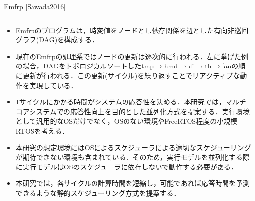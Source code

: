 \documentclass[dvipdfmx,final,t,10pt]{beamer}
\begin{document}
\begin{frame}[fragile]
    \begin{block}{Emfrp \small{[Sawada2016]}}
        \begin{columns}
            \begin{column}{0.55\textwidth}
                \vskip -0.4cm
                \begin{itemize}
                    \item Emfrpのプログラムは，時変値をノードとし依存関係を辺とした有向非巡回グラフ(DAG)を構成する．
                    \item 現在のEmfrpの処理系ではノードの更新は逐次的に行われる．左に挙げた例の場合，DAGをトポロジカルソートしたtmp$\rightarrow$hmd$\rightarrow$di$\rightarrow$th$\rightarrow$fanの順に更新が行われる．この更新(サイクル)を繰り返すことでリアクティブな動作を実現している．
                    \item 1サイクルにかかる時間がシステムの応答性を決める．本研究では，マルチコアシステムでの応答性向上を目的とした並列化方式を提案する．実行環境として汎用的なOSだけでなく，OSのない環境やFreeRTOS程度の小規模RTOSを考える．
                    \item 本研究の想定環境にはOSによるスケジューラによる適切なスケジューリングが期待できない環境も含まれている．そのため，実行モデルを並列化する際に実行モデルはOSのスケジューラに依存しないで動作する必要がある．
                    \item 本研究では，各サイクルの計算時間を短縮し，可能であれば応答時間を予測できるような静的スケジューリング方式を提案する．
                \end{itemize}
            \end{column}
        \end{columns}
    \end{block}


\end{frame}
\end{document}
